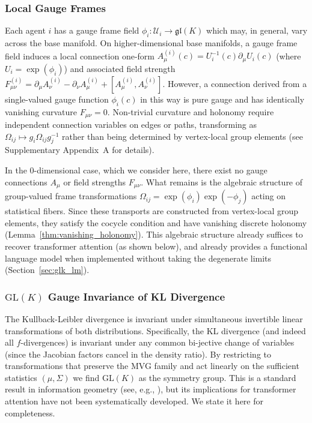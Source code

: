 \documentclass[twoside,11pt]{article}
\begin{document}
\subsubsection{Local Gauge Frames}
Each agent $i$ has a gauge frame field $\phi_i: \mathcal{U}_i \to \mathfrak{gl}(K)$ which may, in general, vary across the base manifold. On higher-dimensional base manifolds, a gauge frame field induces a local connection one-form $A^{(i)}_\mu(c) = U_i^{-1}(c) \partial_\mu U_i(c)$ (where $U_i = \exp(\phi_i)$) and associated field strength $F^{(i)}_{\mu\nu} = \partial_\mu A^{(i)}_\nu - \partial_\nu A^{(i)}_\mu + [A^{(i)}_\mu, A^{(i)}_\nu]$. However, a connection derived from a single-valued gauge function $\phi_i(c)$ in this way is pure gauge and has identically vanishing curvature $F_{\mu\nu} = 0$. Non-trivial curvature and holonomy require independent connection variables on edges or paths, transforming as $\Omega_{ij} \mapsto g_i \Omega_{ij} g_j^{-1}$ rather than being determined by vertex-local group elements (see Supplementary Appendix~A for details).

In the 0-dimensional case, which we consider here, there exist no gauge connections $A_\mu$ or field strengths $F_{\mu\nu}$. What remains is the algebraic structure of group-valued frame transformations $\Omega_{ij} = \exp(\phi_i)\exp(-\phi_j)$ acting on statistical fibers. Since these transports are constructed from vertex-local group elements, they satisfy the cocycle condition and have vanishing discrete holonomy (Lemma~\ref{thm:vanishing_holonomy}). This algebraic structure already suffices to recover transformer attention (as shown below), and already provides a functional language model when implemented without taking the degenerate limits (Section~\ref{sec:glk_lm}).


\subsubsection{$\mathrm{GL}(K)$ Gauge Invariance of KL Divergence}
\label{sec:glk_invariance}

The Kullback-Leibler divergence is invariant under simultaneous invertible linear transformations of both distributions. Specifically, the KL divergence (and indeed all $f$-divergences) is invariant under any common bi-jective change of variables (since the Jacobian factors cancel in the density ratio). By restricting to transformations that preserve the MVG family and act linearly on the sufficient statistics $(\mu, \Sigma)$ we find $\mathrm{GL}(K)$ as the symmetry group. This is a standard result in information geometry (see, e.g., \citet{amari2016information}), but its implications for transformer attention have not been systematically developed. We state it here for completeness.
\end{document}
